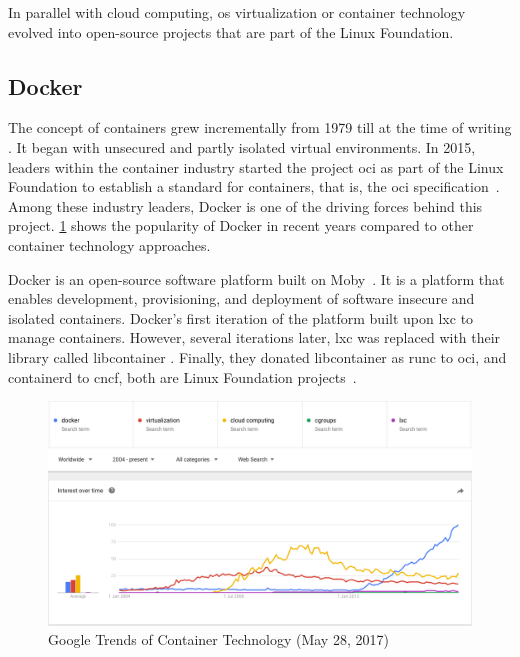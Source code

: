 \skippara In parallel with cloud computing, \gls{os} virtualization or container technology evolved into open-source projects that are part of the Linux Foundation.

\clearpage
\subsection{Docker}\label{background:docker}
The concept of containers grew incrementally from 1979 till at the time of writing \cite{TheEvolu99:online, Momentsi23:online, ABriefHi14:online, TheHisto4:online, AboutOp82:online}.
It began with unsecured and partly isolated virtual environments.
In 2015, leaders within the container industry started the project \gls{oci} as part of the Linux Foundation to establish a standard for containers, that is, the \gls{oci} specification~\cite{AboutOp82:online, Projects37:online}.
Among these industry leaders, Docker is one of the driving forces behind this project.
\cref{fig:trend} shows the popularity of Docker in recent years compared to other container technology approaches.


\skippara Docker is an open-source software platform built on Moby~\cite{mobymoby68:online, WhatisDo49:online}.
It is a platform that enables development, provisioning, and deployment of software insecure and isolated containers.
Docker's  first iteration of the platform built upon \gls{lxc} to manage containers.
However, several iterations later, \gls{lxc} was replaced with their library called libcontainer \cite{dockerli21:online}.
Finally, they donated libcontainer as runc to \gls{oci}, and containerd to \gls{cncf}, both are Linux Foundation projects~\cite{opencont67:online, containe72:online}.

\begin{figure}[h!]
    \centering
    \includegraphics[width=13cm]{figure/trend}
    \caption{Google Trends of Container Technology (May 28, 2017)}
    \label{fig:trend}
\end{figure}

